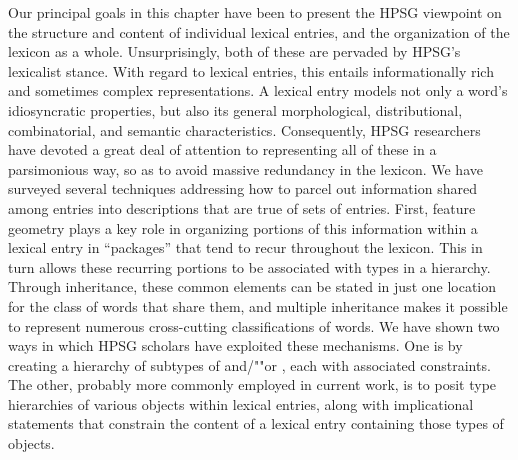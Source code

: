 \documentclass[output=paper
 	        ,biblatex
                ,babelshorthands
                ,newtxmath
                ,draftmode
                ,colorlinks, citecolor=brown
]{langscibook}
\begin{document}
Our principal goals in this chapter have been to present the HPSG viewpoint on the structure and content of individual lexical entries, and the organization of the lexicon as a whole.
Unsurprisingly, both of these are pervaded by HPSG's lexicalist stance.
With regard to lexical entries, this entails informationally rich and sometimes complex representations. 
A lexical entry models not only a word's idiosyncratic properties, but also its general morphological, distributional, combinatorial, and semantic characteristics.
Consequently, HPSG researchers have devoted a great deal of attention to representing all of these in a parsimonious way, so as to avoid massive redundancy in the lexicon.
We have surveyed several techniques addressing how to parcel out information shared among entries into descriptions that are true of sets of entries.
First, feature geometry plays a key role in organizing portions of this information within a lexical entry in ``packages'' that tend to recur throughout the lexicon.
This in turn allows these recurring portions to be associated with types in a hierarchy.
Through inheritance, these common elements can be stated in just one location for the class of words that share them, and multiple inheritance makes it possible to represent numerous cross-cutting classifications of words.
We have shown two ways in which HPSG scholars have exploited these mechanisms.
One is by creating a hierarchy of subtypes of  and/""or , each with associated constraints.
The other, probably more commonly employed in current work, is to posit type hierarchies of various objects within lexical entries, along with implicational statements that constrain the content of a lexical entry containing those types of objects.
\end{document}
